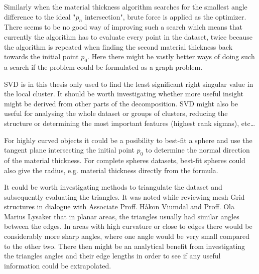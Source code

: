 \documentclass[%
]{USN-MSc}
\begin{document}
Similarly when the material thickness algorithm searches for the smallest angle difference to the ideal "\(p_n\) intersection", brute force is applied as the optimizer. There seems to be no good way of improving such a search which means that currently the algorithm has to evaluate every point in the dataset, twice because the algorithm is repeated when finding the second material thickness back towards the initial point \(p_0\). Here there might be vastly better ways of doing such a search if the problem could be formulated as a graph problem.

SVD is in this thesis only used to find the least significant right singular value in the local cluster. It should be worth investigating whether more useful insight might be derived from other parts of the decomposition. SVD might also be useful for analysing the whole dataset or groups of clusters, reducing the structure or determining the most important features (highest rank sigmas), etc\dots

For highly curved objects it could be a posibility to best-fit a sphere and use the tangent plane intersecting the initial point \(p_0\) to determine the normal direction of the material thickness. For complete spheres datasets, best-fit spheres could also give the radius, e.g. material thickness directly from the formula.

It could be worth investigating methods to triangulate the dataset and subsequently evaluating the triangles. It was noted while reviewing mesh Grid structures in dialogue with Associate Proff. Håkon Viumdal and Proff. Ola Marius Lysaker that in planar areas, the triangles usually had similar angles between the edges. In areas with high curvature or close to edges there would be considerably more sharp angles, where one angle would be very small compared to the other two. There then might be an analytical benefit from investigating the triangles angles and their edge lengths in order to see if any useful information could be extrapolated.


~\nocite{*}


\printbibliography[heading=bibintoc]

\appendix
\end{document}
